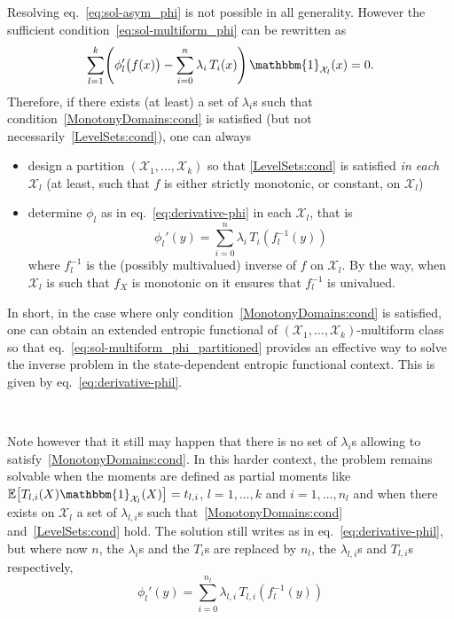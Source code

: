 \documentclass[entropy,article,submit,moreauthors,pdftex]{Definitions/mdpi}
\def\X{\mathcal{X}}%
\def\un{\mathbbm{1}}%
\newcommand{\Esp}[1]{\mathbb{E}\left[ #1 \right]}%
\begin{document}
Resolving  eq.~\eqref{eq:sol-asym_phi}  is  not   possible  in  all  generality.
However the  sufficient condition~\eqref{eq:sol-multiform_phi} can  be rewritten
as
%
\begin{equation}\label{eq:sol-multiform_phi_partitioned}
\sum_{l=1}^k  \left( \phi_l'\big(f(x)\big)  - \sum_{i=0}^n  \lambda_i \,  T_i(x)
\right) \, \un_{\X_l}(x) = 0.
\end{equation}
%
Therefore,  if  there  exists  (at  least)  a  set  of  $\lambda_i$s  such  that
condition~\ref{MonotonyDomains:cond}       is      satisfied       (but      not
necessarily~\ref{LevelSets:cond}), one can always
%
\begin{itemize}
\item design  a partition  $(\X_1,\ldots,\X_k)$ so that  \ref{LevelSets:cond} is
  satisfied {\em  in each $\X_l$}  (at least, such  that $f$ is  either strictly
  monotonic, or constant, on $\X_l$)
%
\item  determine $\phi_l$  as in  eq.~\eqref{eq:derivative-phi} in  each $\X_l$,
  that is
  \begin{equation}\label{eq:derivative-phil}
  \phi_l'(y) = \sum_{i=0}^n \lambda_i \, T_i \left(f_l^{-1}(y)\right)
  \end{equation}
  where $f_l^{-1}$  is the (possibly multivalued)  inverse of $f$ on  $\X_l$. By
  the  way, when  $\X_l$ is  such that  $f_X$ is  monotonic on  it ensures  that
  $f_l^{-1}$ is univalued.
\end{itemize}

In  short,  in  the  case  where  only  condition~\ref{MonotonyDomains:cond}  is
satisfied,    one   can    obtain   an    extended   entropic    functional   of
$(\X_1,\ldots,\X_k)$-multiform             class             so             that
eq.~\eqref{eq:sol-multiform_phi_partitioned} provides an  effective way to solve
the inverse problem in the  state-dependent entropic functional context. This is
given by eq.~\eqref{eq:derivative-phil}.

\

Note however  that it  still may  happen that  there is  no set  of $\lambda_i$s
allowing to satisfy~\ref{MonotonyDomains:cond}.  In  this harder context, the
problem remains  solvable when the moments  are defined as partial  moments like
$\Esp{T_{l,i}(X) \un_{\X_l}(X)} =  t_{l,i}$, $l = 1 ,  \ldots , k$ and $i  = 1 ,
\ldots ,  n_l$ and  when there exists  on $\X_l$ a  set of  $\lambda_{l,i}$s such
that~\ref{MonotonyDomains:cond}  and~\ref{LevelSets:cond}  hold.   The  solution
still  writes  as in  eq.~\eqref{eq:derivative-phil},  but  where now  $n$,  the
$\lambda_i$s  and the  $T_i$s are  replaced by  $n_l$, the  $\lambda_{l,i}$s and
$T_{l,i}$s respectively,
%
\begin{equation}\label{eq:derivative-phil-partial}
\phi_l'(y) = \sum_{i=0}^{n_l} \lambda_{l,i} \, T_{l,i} \left(f_l^{-1}(y)\right)
\end{equation}
\end{document}
